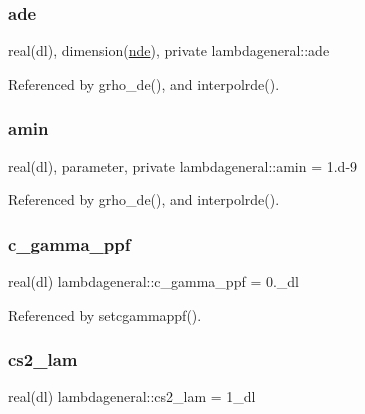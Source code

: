 \subsubsection{\texorpdfstring{ade}{ade}}
{\footnotesize\ttfamily real(dl), dimension(\mbox{\hyperlink{namespacelambdageneral_ae21da0c8fff86159b789dee9579bd7d5}{nde}}), private lambdageneral\+::ade\hspace{0.3cm}{\ttfamily [private]}}



Referenced by grho\+\_\+de(), and interpolrde().

\mbox{\label{namespacelambdageneral_a45e4f8d95a544fe1221e6ff186d9f4b9}} 
\subsubsection{\texorpdfstring{amin}{amin}}
{\footnotesize\ttfamily real(dl), parameter, private lambdageneral\+::amin = 1.d-\/9\hspace{0.3cm}{\ttfamily [private]}}



Referenced by grho\+\_\+de(), and interpolrde().

\mbox{\label{namespacelambdageneral_a85e391fa1c34171d68cc178f0d0b9d8a}} 
\subsubsection{\texorpdfstring{c\+\_\+gamma\+\_\+ppf}{c\_gamma\_ppf}}
{\footnotesize\ttfamily real(dl) lambdageneral\+::c\+\_\+gamma\+\_\+ppf = 0.\+\_\+dl}



Referenced by setcgammappf().

\mbox{\label{namespacelambdageneral_a5df860ac945ff458c8f809a63ea3987f}} 
\subsubsection{\texorpdfstring{cs2\+\_\+lam}{cs2\_lam}}
{\footnotesize\ttfamily real(dl) lambdageneral\+::cs2\+\_\+lam = 1\+\_\+dl}



